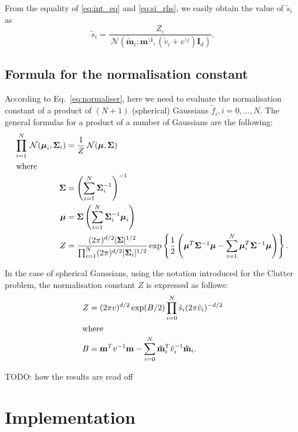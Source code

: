\documentclass[11pt]{article}
\newcommand{\vek}[1]{\ensuremath{\mathbf{#1}}}
\newcommand{\norm}{\ensuremath{\:\mathcal{N}}}
\newcommand{\unity}{\ensuremath{\mathbf{I}}}
\begin{document}
From the equality of \eqref{eq:int_eq} and \eqref{eq:si_rhs}, we easily 
obtain the value of $\tilde{s}_i$ as
\begin{equation}
	\tilde{s}_i = \frac{Z_i}{\norm(\vek{\tilde{m}}_i;
							\vek{m^{\setminus i}}, (\tilde{v}_i + v^{\setminus 
							i})\unity_d)}.
\end{equation}

\subsection*{Formula for the normalisation constant}

According to Eq.~\eqref{eq:normaliser}, here we need to evaluate the 
normalisation constant of a product of $(N + 1)$ (spherical) Gaussians 
$\tilde{f}_i, i=0,\dots,N$. The general formulas for a product of a number 
of Gaussians are the following:
\begin{align}
	\prod_{i=1}^{N} \norm(\boldsymbol{\mu}_i, \vek{\Sigma}_i)
		&= \frac{1}{Z}\norm(\boldsymbol{\mu}, \vek{\Sigma}) \\
\intertext{where}
	\boldsymbol{\Sigma} &=
		\left(\sum_{i=1}^{N}\vek{\Sigma}_i^{-1}\right)^{-1} \\
	\boldsymbol{\mu} &= \vek{\Sigma}\left(
		\sum_{i=1}^N\vek{\Sigma}_i^{-1}\boldsymbol{\mu}_i\right) \\
	Z &= \frac{(2\pi)^{d/2}|\vek{\Sigma}|^{1/2}}
						{\prod_{i=1}^N(2\pi)^{d/2}|\vek{\Sigma}_i|^{1/2}}
			 \exp\left\{\frac{1}{2}\left(
			 		\boldsymbol{\mu}^T\vek{\Sigma}^{-1}\boldsymbol{\mu}
					- \sum_{i=1}^N\boldsymbol{\mu}_i^T
												\vek{\Sigma}^{-1}\boldsymbol{\mu}
						\right)\right\}.
\end{align}

In the case of spherical Gaussians, using the notation introduced for the 
Clutter problem, the normalisation constant $Z$ is expressed as follows:
\begin{align}
	Z &= (2\pi v)^{d/2}\exp(B/2)\prod_{i=0}^N
					\tilde{s}_i(2\pi\tilde{v}_i)^{-d/2} \\
\intertext{where}
	B &= \vek{m}^Tv^{-1}\vek{m}
			 - \sum_{i=0}^N\vek{\tilde{m}}_i^T\tilde{v}_i^{-1}\vek{\tilde{m}}_i.
\end{align}

TODO: how the results are read off

\section{Implementation}
\label{sec:impl}
\end{document}
